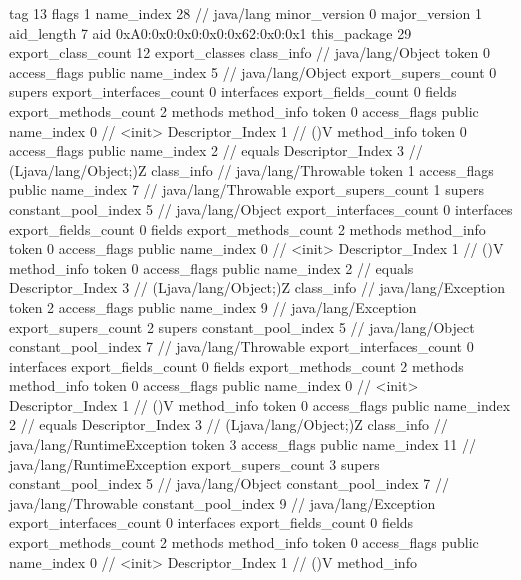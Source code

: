 {{{			tag	13
			flags	1
			name_index	28		// java/lang
			minor_version	0
			major_version	1
			aid_length	7
			aid	0xA0:0x0:0x0:0x0:0x62:0x0:0x1
		}
	}
	this_package	29
	export_class_count	12
	export_classes {
		class_info {		// java/lang/Object
			token	0
			access_flags	public
			name_index	5		// java/lang/Object
			export_supers_count	0
			supers {
			}
			export_interfaces_count	0
			interfaces {
			}
			export_fields_count	0
			fields {
			}
			export_methods_count	2
			methods {
				method_info {
					token	0
					access_flags	public
					name_index	0		// <init>
					Descriptor_Index	1		// ()V
				}
				method_info {
					token	0
					access_flags	public
					name_index	2		// equals
					Descriptor_Index	3		// (Ljava/lang/Object;)Z
				}
			}
		}
		class_info {		// java/lang/Throwable
			token	1
			access_flags	public
			name_index	7		// java/lang/Throwable
			export_supers_count	1
			supers {
				constant_pool_index	5		// java/lang/Object
			}
			export_interfaces_count	0
			interfaces {
			}
			export_fields_count	0
			fields {
			}
			export_methods_count	2
			methods {
				method_info {
					token	0
					access_flags	public
					name_index	0		// <init>
					Descriptor_Index	1		// ()V
				}
				method_info {
					token	0
					access_flags	public
					name_index	2		// equals
					Descriptor_Index	3		// (Ljava/lang/Object;)Z
				}
			}
		}
		class_info {		// java/lang/Exception
			token	2
			access_flags	public
			name_index	9		// java/lang/Exception
			export_supers_count	2
			supers {
				constant_pool_index	5		// java/lang/Object
				constant_pool_index	7		// java/lang/Throwable
			}
			export_interfaces_count	0
			interfaces {
			}
			export_fields_count	0
			fields {
			}
			export_methods_count	2
			methods {
				method_info {
					token	0
					access_flags	public
					name_index	0		// <init>
					Descriptor_Index	1		// ()V
				}
				method_info {
					token	0
					access_flags	public
					name_index	2		// equals
					Descriptor_Index	3		// (Ljava/lang/Object;)Z
				}
			}
		}
		class_info {		// java/lang/RuntimeException
			token	3
			access_flags	public
			name_index	11		// java/lang/RuntimeException
			export_supers_count	3
			supers {
				constant_pool_index	5		// java/lang/Object
				constant_pool_index	7		// java/lang/Throwable
				constant_pool_index	9		// java/lang/Exception
			}
			export_interfaces_count	0
			interfaces {
			}
			export_fields_count	0
			fields {
			}
			export_methods_count	2
			methods {
				method_info {
					token	0
					access_flags	public
					name_index	0		// <init>
					Descriptor_Index	1		// ()V
				}
				method_info {
}}}}}
